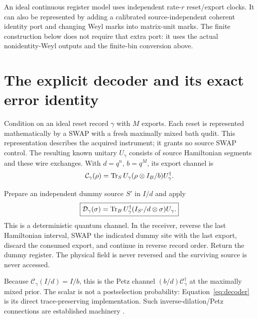 \documentclass[11pt,a4paper]{article}
\newcommand{\cC}{\mathcal C}\newcommand{\cD}{\mathcal D}\newcommand{\cR}{\mathcal R}\newcommand{\cV}{\mathcal V}\newcommand{\cJ}{\mathcal J}
\begin{document}
An ideal continuous register model uses independent rate-$r$ reset/export clocks. It can also be represented by adding a calibrated source-independent coherent identity port and changing Weyl marks into matrix-unit marks. The finite construction below does not require that extra port: it uses the actual nonidentity-Weyl outputs and the finite-bin conversion above.

\section{The explicit decoder and its exact error identity}

Condition on an ideal reset record $\gamma$ with $M$ exports. Each reset is represented mathematically by a SWAP with a fresh maximally mixed bath qudit. This representation describes the acquired instrument; it grants no source SWAP control. The resulting known unitary $U_\gamma$ consists of source Hamiltonian segments and these wire exchanges. With $d=q^n$, $b=q^M$, its export channel is
\begin{equation}
\cC_\gamma(\rho)=\Tr_S U_\gamma(\rho\otimes I_B/b)U_\gamma^\dagger.
\end{equation}

Prepare an independent dummy source $S'$ in $I/d$ and apply
\begin{equation}
\boxed{\cD_\gamma(\sigma)=\Tr_B U_\gamma^\dagger(I_{S'}/d\otimes\sigma)U_\gamma.}
\label{eq:decoder}
\end{equation}
This is a deterministic quantum channel. In the receiver, reverse the last Hamiltonian interval, SWAP the indicated dummy site with the last export, discard the consumed export, and continue in reverse record order. Return the dummy register. The physical field is never reversed and the surviving source is never accessed.

Because $\cC_\gamma(I/d)=I/b$, this is the Petz channel $(b/d)\cC_\gamma^\dagger$ at the maximally mixed prior. The scalar is not a postselection probability: Equation~\eqref{eq:decoder} is its direct trace-preserving implementation. Such inverse-dilation/Petz connections are established machinery \cite{aw2024,song2026,gilyen2022}.
\end{document}
